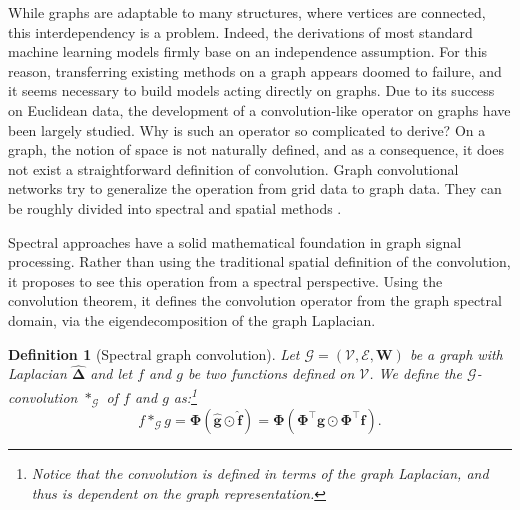 \documentclass{article}
\newtheorem{definition}{Definition}[section]
\begin{document}
While graphs are adaptable to many structures, where vertices are connected, this interdependency is a problem. Indeed, the derivations of most standard machine learning models firmly base on an independence assumption. For this reason, transferring existing methods on a graph appears doomed to failure, and it seems necessary to build models acting directly on graphs. Due to its success on Euclidean data, the development of a convolution-like operator on graphs have been largely studied. Why is such an operator so complicated to derive? On a graph, the notion of space is not naturally defined, and as a consequence, it does not exist a straightforward definition of convolution. Graph convolutional networks try to generalize the operation from grid data to graph data. They can be roughly divided into spectral \citep{scarselli2008graph, bruna2013spectral, henaff2015deep, defferrard2016chebnet, kipf2016gcn} and spatial methods \citep{masci2015geodesic, boscaini2016learning, monti2017geometric}.

Spectral approaches have a solid mathematical foundation in graph signal processing. Rather than using the traditional spatial definition of the convolution, it proposes to see this operation from a spectral perspective. Using the convolution theorem, it defines the convolution operator from the graph spectral domain, via the eigendecomposition of the graph Laplacian.

\begin{definition}[Spectral graph convolution]
Let $\mathcal{G} = (\mathcal{V}, \mathcal{E}, \boldsymbol{W})$ be a graph with Laplacian $\boldsymbol{\hat{\Delta}}$ and let $f$ and $g$ be two functions defined on $\mathcal{V}$. We define the $\mathcal{G}$-convolution $*_{\mathcal{G}}$ of $f$ and $g$ as:\footnote{Notice that the convolution is defined in terms of the graph Laplacian, and thus is dependent on the graph representation.}
\begin{equation}
f *_{\mathcal{G}} g = \boldsymbol{\Phi} (\boldsymbol{\hat{g}} \odot \boldsymbol{\hat{f}}) = \boldsymbol{\Phi} (\boldsymbol{\Phi}^{\top} \boldsymbol{g} \odot \boldsymbol{\Phi}^{\top} \boldsymbol{f}).
\end{equation}
\end{definition}
\end{document}
